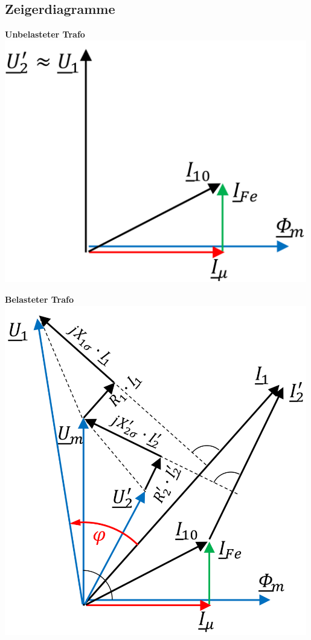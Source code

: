 \subsection{Zeigerdiagramme}
\begin{minipage}{0.33\textwidth}
\textbf{Unbelasteter Trafo}\\
\includegraphics[width=0.99\textwidth]{bilder/trafo_leerlauf.png}
\end{minipage}
\begin{minipage}{0.33\textwidth}
\textbf{Belasteter Trafo}\\
\includegraphics[width=0.99\textwidth]{bilder/trafo_nennlast.png}
\end{minipage}
